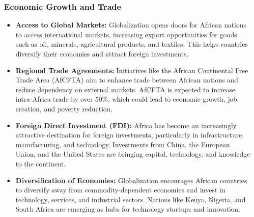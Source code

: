 \documentclass[10pt]{article}
\begin{document}
\subsubsection*{Economic Growth and Trade}
\begin{itemize}
  \item \textbf{Access to Global Markets:} Globalization opens doors for African nations to
    access international markets, increasing export opportunities for goods such as
    oil, minerals, agricultural products, and textiles. This helps countries diversify
    their economies and attract foreign investments.

  \item \textbf{Regional Trade Agreements:} Initiatives like the African Continental Free Trade
    Area (AfCFTA) aim to enhance trade between African nations and reduce
    dependency on external markets. AfCFTA is expected to increase intra-Africa
    trade by over 50\%, which could lead to economic growth, job creation, and
    poverty reduction.

  \item \textbf{Foreign Direct Investment (FDI):} Africa has become an increasingly attractive
    destination for foreign investments, particularly in infrastructure, manufacturing,
    and technology. Investments from China, the European Union, and the United
    States are bringing capital, technology, and knowledge to the continent.

  \item \textbf{Diversification of Economies:} Globalization encourages African countries to
    diversify away from commodity-dependent economies and invest in technology,
    services, and industrial sectors. Nations like Kenya, Nigeria, and South Africa are
    emerging as hubs for technology startups and innovation.
\end{itemize}
\end{document}
